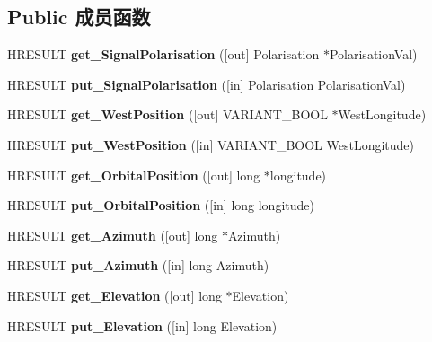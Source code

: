\subsection*{Public 成员函数}
\begin{DoxyCompactItemize}
\item 
\mbox{\label{interface_i_d_v_b_s_locator_a554fdd37b24ea81b1bb2ae6a3f9fd032}} 
H\+R\+E\+S\+U\+LT {\bfseries get\+\_\+\+Signal\+Polarisation} (\mbox{[}out\mbox{]} Polarisation $\ast$Polarisation\+Val)
\item 
\mbox{\label{interface_i_d_v_b_s_locator_af9f7643ac81ab85868c12ae4d4d3609a}} 
H\+R\+E\+S\+U\+LT {\bfseries put\+\_\+\+Signal\+Polarisation} (\mbox{[}in\mbox{]} Polarisation Polarisation\+Val)
\item 
\mbox{\label{interface_i_d_v_b_s_locator_a479f971cf91257dd518167286fcfd325}} 
H\+R\+E\+S\+U\+LT {\bfseries get\+\_\+\+West\+Position} (\mbox{[}out\mbox{]} V\+A\+R\+I\+A\+N\+T\+\_\+\+B\+O\+OL $\ast$West\+Longitude)
\item 
\mbox{\label{interface_i_d_v_b_s_locator_a45832f1f2b6c3522ee46e5ce57171a05}} 
H\+R\+E\+S\+U\+LT {\bfseries put\+\_\+\+West\+Position} (\mbox{[}in\mbox{]} V\+A\+R\+I\+A\+N\+T\+\_\+\+B\+O\+OL West\+Longitude)
\item 
\mbox{\label{interface_i_d_v_b_s_locator_a314e17d495ed99a8eafd521e7b1837e3}} 
H\+R\+E\+S\+U\+LT {\bfseries get\+\_\+\+Orbital\+Position} (\mbox{[}out\mbox{]} long $\ast$longitude)
\item 
\mbox{\label{interface_i_d_v_b_s_locator_a303486482630bd607453a80248e9779e}} 
H\+R\+E\+S\+U\+LT {\bfseries put\+\_\+\+Orbital\+Position} (\mbox{[}in\mbox{]} long longitude)
\item 
\mbox{\label{interface_i_d_v_b_s_locator_a1615b3450c966aacf5c661586314498f}} 
H\+R\+E\+S\+U\+LT {\bfseries get\+\_\+\+Azimuth} (\mbox{[}out\mbox{]} long $\ast$Azimuth)
\item 
\mbox{\label{interface_i_d_v_b_s_locator_af9ed96370e53d53d7e7c3bf9e8c8a1e0}} 
H\+R\+E\+S\+U\+LT {\bfseries put\+\_\+\+Azimuth} (\mbox{[}in\mbox{]} long Azimuth)
\item 
\mbox{\label{interface_i_d_v_b_s_locator_acf4cf3971c9c3a68b82e56b3bbe75a88}} 
H\+R\+E\+S\+U\+LT {\bfseries get\+\_\+\+Elevation} (\mbox{[}out\mbox{]} long $\ast$Elevation)
\item 
\mbox{\label{interface_i_d_v_b_s_locator_ae1c8ee6935515ceb43a0f0dccd398217}} 
H\+R\+E\+S\+U\+LT {\bfseries put\+\_\+\+Elevation} (\mbox{[}in\mbox{]} long Elevation)
\end{DoxyCompactItemize}
